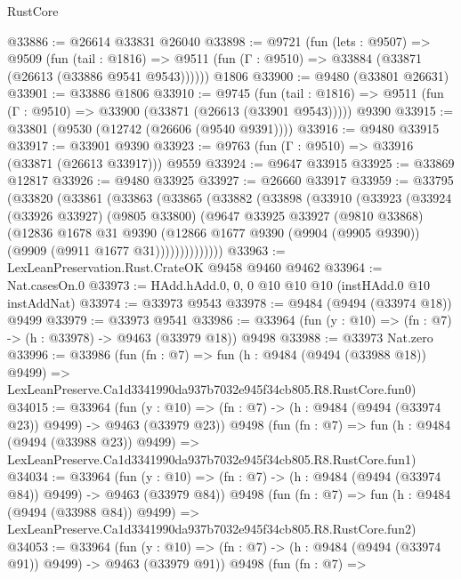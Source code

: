 \begin{lexlean}{RustCore}
\begin{coremodule}
@33886 := @26614 @33831 @26040
@33898 := @9721
    (fun (lets : @9507) =>
    @9509
      (fun (tail : @1816) =>
      @9511 (fun (Γ : @9510) => @33884 (@33871 (@26613 (@33886 @9541 @9543))))))
    @1806
@33900 := @9480 (@33801 @26631)
@33901 := @33886 @1806
@33910 := @9745
    (fun (tail : @1816) => @9511 (fun (Γ : @9510) => @33900 (@33871 (@26613 (@33901 @9543)))))
    @9390
@33915 := @33801 (@9530 (@12742 (@26606 (@9540 @9391))))
@33916 := @9480 @33915
@33917 := @33901 @9390
@33923 := @9763 (fun (Γ : @9510) => @33916 (@33871 (@26613 @33917))) @9559
@33924 := @9647 @33915
@33925 := @33869 @12817
@33926 := @9480 @33925
@33927 := @26660 @33917
@33959 := @33795
    (@33820
      (@33861
        (@33863
          (@33865
            (@33882
              (@33898
                (@33910
                  (@33923
                    (@33924
                      (@33926 @33927)
                      (@9805 @33800)
                      (@9647
                        @33925
                        @33927
                        (@9810 @33868)
                        (@12836
                          @1678
                          @31
                          @9390
                          (@12866
                            @1677
                            @9390
                            (@9904 (@9905 @9390))
                            (@9909 (@9911 @1677 @31))))))))))))))
@33963 := LexLeanPreservation.Rust.CrateOK @9458 @9460 @9462
@33964 := Nat.casesOn.{0}
@33973 := HAdd.hAdd.{0, 0, 0} @10 @10 @10 (instHAdd.{0} @10 instAddNat)
@33974 := @33973 @9543
@33978 := @9484 (@9494 (@33974 @18)) @9499
@33979 := @33973 @9541
@33986 := @33964 (fun (y : @10) => (fn : @7) -> (h : @33978) -> @9463 (@33979 @18)) @9498
@33988 := @33973 Nat.zero
@33996 := @33986
    (fun (fn : @7) =>
    fun (h : @9484 (@9494 (@33988 @18)) @9499) =>
    LexLeanPreserve.Ca1d3341990da937b7032e945f34cb805.R8.RustCore.fun0)
@34015 := @33964
    (fun (y : @10) => (fn : @7) -> (h : @9484 (@9494 (@33974 @23)) @9499) -> @9463 (@33979 @23))
    @9498
    (fun (fn : @7) =>
    fun (h : @9484 (@9494 (@33988 @23)) @9499) =>
    LexLeanPreserve.Ca1d3341990da937b7032e945f34cb805.R8.RustCore.fun1)
@34034 := @33964
    (fun (y : @10) => (fn : @7) -> (h : @9484 (@9494 (@33974 @84)) @9499) -> @9463 (@33979 @84))
    @9498
    (fun (fn : @7) =>
    fun (h : @9484 (@9494 (@33988 @84)) @9499) =>
    LexLeanPreserve.Ca1d3341990da937b7032e945f34cb805.R8.RustCore.fun2)
@34053 := @33964
    (fun (y : @10) => (fn : @7) -> (h : @9484 (@9494 (@33974 @91)) @9499) -> @9463 (@33979 @91))
    @9498
    (fun (fn : @7) =>

\end{coremodule}
\end{lexlean}
